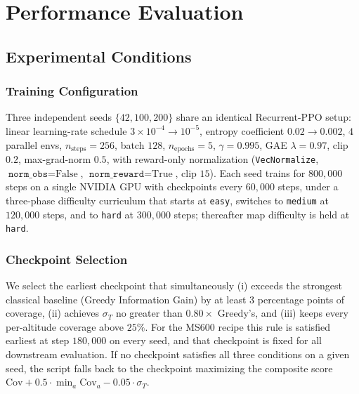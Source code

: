 \documentclass[conference]{IEEEtran}
\begin{document}
\section{Performance Evaluation}

\subsection{Experimental Conditions}

\subsubsection{Training Configuration}
Three independent seeds $\{42,100,200\}$ share an identical Recurrent-PPO setup: linear learning-rate schedule $3{\times}10^{-4}\!\to\!10^{-5}$, entropy coefficient $0.02\!\to\!0.002$, $4$ parallel envs, $n_{\text{steps}}{=}256$, batch $128$, $n_{\text{epochs}}{=}5$, $\gamma{=}0.995$, GAE $\lambda{=}0.97$, clip $0.2$, max-grad-norm $0.5$, with reward-only normalization (\texttt{VecNormalize}, $\texttt{norm\_obs}\!=\!\text{False}$, $\texttt{norm\_reward}\!=\!\text{True}$, clip $15$). Each seed trains for $800{,}000$ steps on a single NVIDIA GPU with checkpoints every $60{,}000$ steps, under a three-phase difficulty curriculum that starts at \texttt{easy}, switches to \texttt{medium} at $120{,}000$ steps, and to \texttt{hard} at $300{,}000$ steps; thereafter map difficulty is held at \texttt{hard}.

\subsubsection{Checkpoint Selection}
We select the earliest checkpoint that simultaneously (i) exceeds the strongest classical baseline (Greedy Information Gain) by at least $3$ percentage points of coverage, (ii) achieves $\sigma_T$ no greater than $0.80\!\times\!$ Greedy's, and (iii) keeps every per-altitude coverage above $25\%$. For the MS600 recipe this rule is satisfied earliest at step $180{,}000$ on every seed, and that checkpoint is fixed for all downstream evaluation. If no checkpoint satisfies all three conditions on a given seed, the script falls back to the checkpoint maximizing the composite score $\mathrm{Cov}+0.5\!\cdot\!\min_a\mathrm{Cov}_a-0.05\!\cdot\!\sigma_T$.
\end{document}
